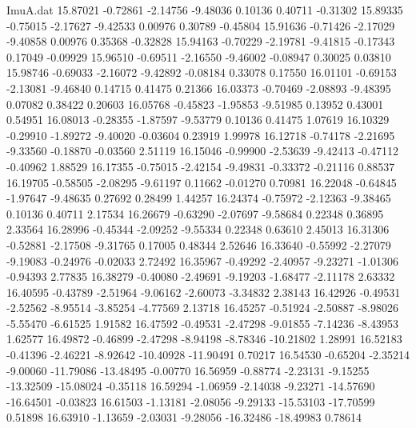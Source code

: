 \begin{filecontents}{ImuA.dat}
  15.87021   -0.72861   -2.14756   -9.48036    0.10136    0.40711   -0.31302
  15.89335   -0.75015   -2.17627   -9.42533    0.00976    0.30789   -0.45804
  15.91636   -0.71426   -2.17029   -9.40858    0.00976    0.35368   -0.32828
  15.94163   -0.70229   -2.19781   -9.41815   -0.17343    0.17049   -0.09929
  15.96510   -0.69511   -2.16550   -9.46002   -0.08947    0.30025    0.03810
  15.98746   -0.69033   -2.16072   -9.42892   -0.08184    0.33078    0.17550
  16.01101   -0.69153   -2.13081   -9.46840    0.14715    0.41475    0.21366
  16.03373   -0.70469   -2.08893   -9.48395    0.07082    0.38422    0.20603
  16.05768   -0.45823   -1.95853   -9.51985    0.13952    0.43001    0.54951
  16.08013   -0.28355   -1.87597   -9.53779    0.10136    0.41475    1.07619
  16.10329   -0.29910   -1.89272   -9.40020   -0.03604    0.23919    1.99978
  16.12718   -0.74178   -2.21695   -9.33560   -0.18870   -0.03560    2.51119
  16.15046   -0.99900   -2.53639   -9.42413   -0.47112   -0.40962    1.88529
  16.17355   -0.75015   -2.42154   -9.49831   -0.33372   -0.21116    0.88537
  16.19705   -0.58505   -2.08295   -9.61197    0.11662   -0.01270    0.70981
  16.22048   -0.64845   -1.97647   -9.48635    0.27692    0.28499    1.44257
  16.24374   -0.75972   -2.12363   -9.38465    0.10136    0.40711    2.17534
  16.26679   -0.63290   -2.07697   -9.58684    0.22348    0.36895    2.33564
  16.28996   -0.45344   -2.09252   -9.55334    0.22348    0.63610    2.45013
  16.31306   -0.52881   -2.17508   -9.31765    0.17005    0.48344    2.52646
  16.33640   -0.55992   -2.27079   -9.19083   -0.24976   -0.02033    2.72492
  16.35967   -0.49292   -2.40957   -9.23271   -1.01306   -0.94393    2.77835
  16.38279   -0.40080   -2.49691   -9.19203   -1.68477   -2.11178    2.63332
  16.40595   -0.43789   -2.51964   -9.06162   -2.60073   -3.34832    2.38143
  16.42926   -0.49531   -2.52562   -8.95514   -3.85254   -4.77569    2.13718
  16.45257   -0.51924   -2.50887   -8.98026   -5.55470   -6.61525    1.91582
  16.47592   -0.49531   -2.47298   -9.01855   -7.14236   -8.43953    1.62577
  16.49872   -0.46899   -2.47298   -8.94198   -8.78346  -10.21802    1.28991
  16.52183   -0.41396   -2.46221   -8.92642  -10.40928  -11.90491    0.70217
  16.54530   -0.65204   -2.35214   -9.00060  -11.79086  -13.48495   -0.00770
  16.56959   -0.88774   -2.23131   -9.15255  -13.32509  -15.08024   -0.35118
  16.59294   -1.06959   -2.14038   -9.23271  -14.57690  -16.64501   -0.03823
  16.61503   -1.13181   -2.08056   -9.29133  -15.53103  -17.70599    0.51898
  16.63910   -1.13659   -2.03031   -9.28056  -16.32486  -18.49983    0.78614

\end{filecontents}
